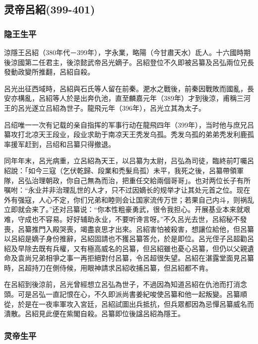 
\subsection{灵帝呂紹\tiny(399-401)}

\subsubsection{隐王生平}

涼隱王呂紹（380年代－399年），字永業，略陽（今甘肅天水）氐人。十六國時期後涼國第二任君主，後涼懿武帝呂光嫡子。呂紹登位不久即被呂纂及呂弘兩位兄長發動政變所推翻，呂紹自殺。

呂光出征西域時，呂紹與石氏等人留在前秦。淝水之戰後，前秦因戰敗而國亂，長安亦構亂，呂紹等人於是出奔仇池，直至麟嘉元年（389年）才到後涼，甫稱三河王的呂光遂立吕紹為世子。龍飛元年（396年），呂光立其為太子。

吕绍唯一一次有记载的亲自指挥的军事行动在龍飛四年（399年），当时他与庶兄吕纂攻打北凉天王段业，段业求助于南凉天王秃发乌孤。秃发乌孤的弟弟秃发利鹿孤率援军赶到，吕绍和吕纂只得撤退。

同年年末，呂光病重，立呂紹為天王，以吕纂为太尉，吕弘為司徒，臨終前叮囑呂紹說：「如今三寇（乞伏乾歸、段業和禿髮烏孤）未平，我死之後，呂纂帶領軍隊，呂弘治理朝政，你自己無為而治，把重任交給兩個哥哥」。也对两位长子有所嘱咐：“永业并非治理乱世的人才，只不过因嫡长的规举才让其处元首之位。现在外有强寇，人心不定，你们兄弟和睦则会让国家流传万世；若果自己内斗，则祸乱立即就会来了。”还对吕纂说：“你本性粗豪勇武，很令我担心。开展基业本来就艰难，守成也不容易。好好辅助永业，不要听谗言呀。”不久呂光去世，呂紹秘不發喪，呂纂推門入殿哭喪，竭盡哀思才出來。呂紹害怕被殺害，想讓位給他，但呂纂以呂紹是嫡子身份推辭，呂紹固請也不獲呂纂答允，於是即位。呂光侄子呂超勸呂紹及早除去既有兵權，又有極高威名的呂纂，但呂紹雖也憂心呂纂，但仍以父親遺命及袁尚兄弟相爭之事一再拒絕對付呂纂，令呂超很失望。呂紹在湛露堂面見呂纂時，呂超持刀在側侍候，用眼神請求呂紹收捕呂纂，但呂紹都不肯。

在呂紹到後涼前，呂光曾經想立呂弘為世子，不過因為知道呂紹在仇池而打消念頭。可是呂弘一直記恨在心，不久即派尚書姜紀唆使呂纂和他一起叛變。呂纂順從，於是在一夜率軍攻入宮廷，呂紹試圖出兵抵抗，但兵眾都因為忌憚呂纂威名而潰散。呂紹見此便在紫閣自殺。呂纂即位後諡呂紹為隱王。

\subsubsection{灵帝生平}

